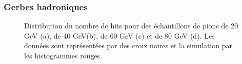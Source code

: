 
\subsubsection{Gerbes hadroniques}

\begin{figure}[!ht]
  \caption{Distribution du nombre de hits pour des échantillons de pions de 20 GeV (a), de 40 GeV(b), de 60 GeV (c) et de 80 GeV (d). Les données sont représentées par des croix noires et la simulation par les histogrammes rouges.\label{fig.pi-nhit}}
\end{figure}

